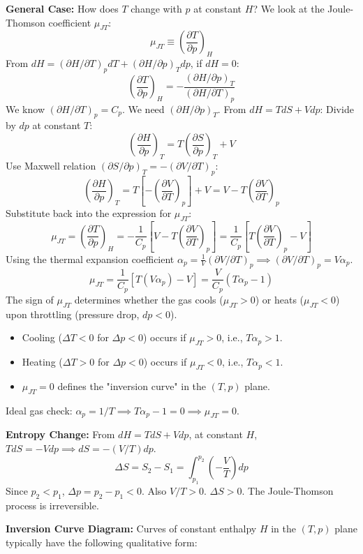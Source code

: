 \documentclass[11pt]{article}
\newcommand{\pderiv}[2]{\frac{\partial #1}{\partial #2}}
\begin{document}
\textbf{General Case:}
How does $T$ change with $p$ at constant $H$? We look at the Joule-Thomson coefficient $\mu_{JT}$:
\[ \mu_{JT} \equiv \left( \pderiv{T}{p} \right)_H \]
From $dH = (\partial H/\partial T)_p dT + (\partial H/\partial p)_T dp$, if $dH=0$:
\[ \left( \pderiv{T}{p} \right)_H = - \frac{(\partial H / \partial p)_T}{(\partial H / \partial T)_p} \]
We know $(\partial H / \partial T)_p = C_p$. We need $(\partial H / \partial p)_T$.
From $dH = T dS + V dp$:
Divide by $dp$ at constant $T$:
\[ \left( \pderiv{H}{p} \right)_T = T \left( \pderiv{S}{p} \right)_T + V \]
Use Maxwell relation $(\partial S / \partial p)_T = -(\partial V / \partial T)_p$:
\[ \left( \pderiv{H}{p} \right)_T = T \left[ - \left( \pderiv{V}{T} \right)_p \right] + V = V - T \left( \pderiv{V}{T} \right)_p \]
Substitute back into the expression for $\mu_{JT}$:
\[ \mu_{JT} = \left( \pderiv{T}{p} \right)_H = - \frac{1}{C_p} \left[ V - T \left( \pderiv{V}{T} \right)_p \right] = \frac{1}{C_p} \left[ T \left( \pderiv{V}{T} \right)_p - V \right] \]
Using the thermal expansion coefficient $\alpha_p = \frac{1}{V} (\partial V / \partial T)_p \implies (\partial V / \partial T)_p = V \alpha_p$.
\[ \mu_{JT} = \frac{1}{C_p} [T (V \alpha_p) - V] = \frac{V}{C_p} (T \alpha_p - 1) \]
The sign of $\mu_{JT}$ determines whether the gas cools ($\mu_{JT}>0$) or heats ($\mu_{JT}<0$) upon throttling (pressure drop, $dp<0$).
\begin{itemize}
    \item Cooling ($\Delta T < 0$ for $\Delta p < 0$) occurs if $\mu_{JT} > 0$, i.e., $T \alpha_p > 1$.
    \item Heating ($\Delta T > 0$ for $\Delta p < 0$) occurs if $\mu_{JT} < 0$, i.e., $T \alpha_p < 1$.
    \item $\mu_{JT}=0$ defines the "inversion curve" in the $(T,p)$ plane.
\end{itemize}
Ideal gas check: $\alpha_p = 1/T \implies T \alpha_p - 1 = 0 \implies \mu_{JT} = 0$.

\textbf{Entropy Change:}
From $dH = TdS + Vdp$, at constant $H$, $TdS = -Vdp \implies dS = -(V/T) dp$.
\[ \Delta S = S_2 - S_1 = \int_{p_1}^{p_2} \left( -\frac{V}{T} \right) dp \]
Since $p_2 < p_1$, $\Delta p = p_2 - p_1 < 0$. Also $V/T > 0$.
$\Delta S > 0$. The Joule-Thomson process is irreversible.

\textbf{Inversion Curve Diagram:}
Curves of constant enthalpy $H$ in the $(T,p)$ plane typically have the following qualitative form:
\end{document}
